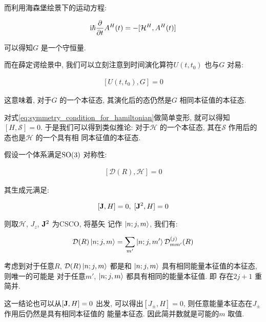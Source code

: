 而利用海森堡绘景下的运动方程:

\begin{equation}
  \begin{aligned}
    {\rm i} \hbar \pdv{}{t} A^{H} (t) = -[\mathcal{H}^{H}, A^{H}(t)]
  \end{aligned}
\end{equation}

可以得知$G$ 是一个守恒量.

而在薛定谔绘景中, 我们可以立刻注意到时间演化算符$U(t,t_0)$
也与$G$ 对易:

\begin{equation}
  \begin{aligned}
    [U(t,t_0), G] = 0
  \end{aligned}
\end{equation}

这意味着, 对于$G$ 的一个本征态, 其演化后的态仍然是$G$ 相同本征值的本征态.

对式\ref{eq:symmetry_condition_for_hamiltonian}做简单变形, 就可以得知 $[H, 
\mathscr{S}] = 0$. 于是我们可以得到类似推论: 对于$\mathcal{\mathcal{H}}$ 
的一个本征态, 其在$\mathscr{S}$ 作用后的态也是$\mathcal{H}$ 的一个具有相
同本征值的本征态.

\begin{eg}[SO(3)对称性]
  假设一个体系满足${\rm SO}(3)$ 对称性:
  
  \begin{equation}
    \begin{aligned}
      [\mathcal{D}(R), \mathcal{H}] = 0
    \end{aligned}
  \end{equation}

  其生成元满足:

  \begin{equation}
    \begin{aligned}
      [{\bf J}, H] = 0,\; [{\bf J}^{2}, H] = 0
    \end{aligned}
  \end{equation}

  则取$\mathcal{H}$, $J_{z}$, ${\bf J}^{2}$ 为CSCO, 将基矢
  记作 $\ket{n;j,m}$, 我们有:

  \begin{equation}
    \begin{aligned}
      \mathcal{D}(R) \ket{n;j,m} = \sum_{m'}\ket{n;j,m'} \mathcal{D}^{(j)}_{mm'}(R)
    \end{aligned}
  \end{equation}

  考虑到对于任意$R$, $\mathcal{D}(R)\ket{n;j,m}$ 都是和
  $\ket{n;j,m}$ 具有相同能量本征值的本征态, 则唯一的可能是
  对于任意$m'$, $\ket{n;j,m}$ 都具有相同的能量本征值. 即
  存在$2j+1$ 重简并.

  这一结论也可以从$[ {\bf J}, H] = 0$ 出发, 可以得出$[J_{\pm}, H] = 0$,
  则任意能量本征态在$J_{\pm}$ 作用后仍然是具有相同本征值的
  能量本征态. 因此简并数就是可能的$m$ 取值.
\end{eg}
